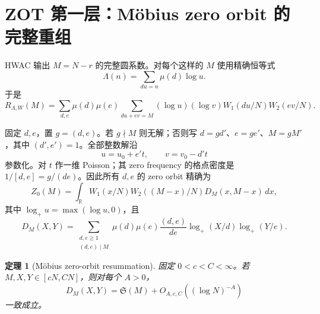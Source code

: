 \documentclass[11pt,a4paper]{ctexart}
\newtheorem{theorem}{定理}[section]
\theoremstyle{definition}
\newcommand{\1}{\mathbf 1}
\begin{document}
\section{ZOT 第一层：Möbius zero orbit 的完整重组}

HWAC 输出 $M=N-r$ 的完整圆系数。对每个这样的 $M$ 使用精确恒等式
\[
\Lambda(n)=\sum_{du=n}\mu(d)\log u.                    \tag{3.1}
\]
于是
\[
R_{\Lambda,W}(M)
=\sum_{d,e}\mu(d)\mu(e)
 \sum_{du+ev=M}(\log u)(\log v)
 W_1(du/N)W_2(ev/N).                                    \tag{3.2}
\]

固定 $d,e$，置 $g=(d,e)$。若 $g\nmid M$ 则无解；否则写
$d=gd'$、$e=ge'$、$M=gM'$，其中 $(d',e')=1$。全部整数解沿
\[
u=u_0+e't,\qquad v=v_0-d't                              \tag{3.3}
\]
参数化。对 $t$ 作一维 Poisson；其 zero frequency 的格点密度是
$1/[d,e]=g/(de)$。因此所有 $d,e$ 的 zero orbit 精确为
\[
Z_0(M)=\int_{\mathbb R}W_1(x/N)W_2((M-x)/N)
D_M(x,M-x)\,dx,                                         \tag{3.4}
\]
其中 $\log_+u=\max(\log u,0)$，且
\[
D_M(X,Y)=
\sum_{\substack{d,e\ge1\\(d,e)\mid M}}
\mu(d)\mu(e)\frac{(d,e)}{de}
\log_+(X/d)\log_+(Y/e).                                \tag{3.5}
\]

\begin{theorem}[Möbius zero-orbit resummation]
固定 $0<c<C<\infty$。若 $M,X,Y\in[cN,CN]$，则对每个 $A>0$，
\[
\boxed{D_M(X,Y)=\mathfrak S(M)+O_{A,c,C}((\log N)^{-A})} \tag{3.6}
\]
一致成立。
\end{theorem}
\end{document}
